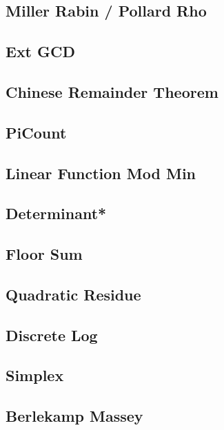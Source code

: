 \subsection{Miller Rabin / Pollard Rho}
\subsection{Ext GCD}
\subsection{Chinese Remainder Theorem}
\subsection{PiCount}
\subsection{Linear Function Mod Min} 
\subsection{Determinant*}
\subsection{Floor Sum}
\subsection{Quadratic Residue}
\subsection{Discrete Log}
\subsection{Simplex}
\subsection{Berlekamp Massey}
